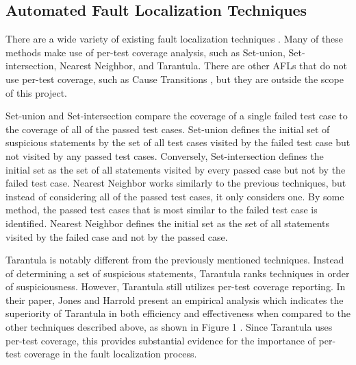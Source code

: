 \documentclass[11pt]{article}
\begin{document}
\subsection{Automated Fault Localization Techniques}

There are a wide variety of existing fault localization techniques
\cite{harrold}. Many of these methods make use of per-test coverage
analysis, such as Set-union, Set-intersection, Nearest Neighbor, and
Tarantula.  There are other AFLs that do not use per-test coverage, such
as Cause Transitions \cite{cause}, but they are outside the scope of this project.  

Set-union and Set-intersection compare the coverage of a single failed
test case to the coverage of all of the passed test cases.  Set-union
defines the initial set of suspicious statements by the set of all test
cases visited by the failed test case but not visited by any passed test
cases.  Conversely, Set-intersection defines the initial set as the set
of all statements visited by every passed case but not by the failed
test case.  Nearest Neighbor works similarly to the previous techniques,
but instead of considering all of the passed test cases, it only
considers one.  By some method, the passed test cases that is most
similar to the failed test case is identified.  Nearest Neighbor defines
the initial set as the set of all statements visited by the failed case
and not by the passed case.

Tarantula is notably different from the previously mentioned techniques.
Instead of determining a set of suspicious statements, Tarantula ranks
techniques in order of suspiciousness.  However, Tarantula still
utilizes per-test coverage reporting.  In their paper, Jones and Harrold
present an empirical analysis which indicates the superiority of
Tarantula in both efficiency and effectiveness when compared to the
other techniques described above, as shown in Figure 1 \cite{harrold}.  Since Tarantula
uses per-test coverage, this provides substantial evidence for the
importance of per-test coverage in the fault localization process.
\end{document}

